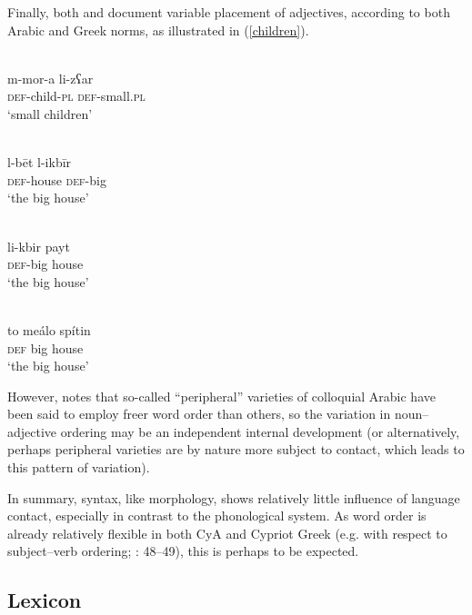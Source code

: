 \documentclass[output=paper]{langsci/langscibook}
\begin{document}
Finally, both \citet{Roth2004} and \citet{Newton1964} document variable placement of adjectives, according to both Arabic and Greek norms, as illustrated in (\ref{children}). 

\ea\label{children}
\ea {}\\
\gll m-mor-a li-zʕar\\
     \textsc{def}-child-\textsc{pl} \textsc{def}-small.\textsc{pl}  \\
\glt ‘small children’

\ex
{}\\
\gll l-bēt l-ikbīr\\
     \textsc{def}-house \textsc{def}-big  \\
\glt ‘the big house’

\ex
{}\\
\gll li-kbir payt\\
     \textsc{def}-big house  \\
\glt ‘the big house’

\ex
{}\\
\gll to meálo spítin\\
     \textsc{def} big house  \\
\glt ‘the big house’
\z
\z

However, \citet{Borg2004} notes that so-called “peripheral” varieties of colloquial Arabic have been said to employ freer word order than others, so the variation in noun–adjective ordering may be an independent internal development (or alternatively, perhaps peripheral varieties are by nature more subject to contact, which leads to this pattern of variation). 

In summary, syntax, like morphology, shows relatively little influence of language contact, especially in contrast to the phonological system. As word order is already relatively flexible in both CyA and Cypriot Greek (e.g. with respect to subject–verb ordering; \citealt{Newton1964}: 48–49), this is perhaps to be expected.

\subsection{Lexicon}
\end{document}
